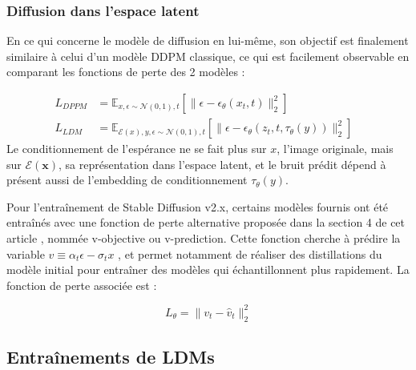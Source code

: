 \documentclass{article}
\begin{document}
\subsubsection{Diffusion dans l'espace latent}
\begin{spacing}{1}
En ce qui concerne le modèle de diffusion en lui-même, son objectif est finalement similaire à celui d'un modèle DDPM classique, ce qui est facilement observable en comparant les fonctions de perte des 2 modèles :
\end{spacing}
\vspace{-0.5cm}
\large
\begin{align*}
L_{DPPM} &= \mathbb{E}_{x, \epsilon \sim \mathcal{N}(0,1), t} [\lVert \epsilon - \epsilon_{\theta}(x_t, t) \rVert_2^2] &\tag*{ \normalsize modèle DDPM \large}\\
L_{LDM} &= \mathbb{E}_{\mathcal{E}(x), y, \epsilon \sim \mathcal{N}(0,1), t} [\lVert \epsilon - \epsilon_{\theta}(z_t, t, \tau_{\theta}(y)) \rVert_2^2] &\tag*{ \normalsize modèle LDM \large}
\end{align*}
\normalsize
Le conditionnement de l'espérance ne se fait plus sur $x$, l'image originale, mais sur $\mathcal{E}(\textbf{x})$, sa représentation dans l'espace latent, et le bruit prédit dépend à présent aussi de l'embedding de conditionnement $\tau_{\theta}(y)$. \par
\begin{spacing}{1}
Pour l'entraînement de Stable Diffusion v2.x, certains modèles fournis ont été entraînés avec une fonction de perte alternative proposée dans la section 4 de cet article \cite{prog_distillation}, nommée v-objective ou v-prediction. Cette fonction cherche à prédire la variable $v \equiv \alpha_t \epsilon - \sigma_t x$ , et permet notamment de réaliser des distillations du modèle initial pour entraîner des modèles qui échantillonnent plus rapidement. La fonction de perte associée est :
\end{spacing}
\vspace{-0.3cm}
\large
$$ L_{\theta} = \lVert v_t - \hat{v}_t \rVert_2^2$$
\normalsize

\subsection{Entraînements de LDMs}
\end{document}
